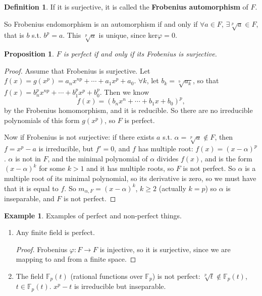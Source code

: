 \documentclass[9pt,reqno,twoside]{amsbook}
\theoremstyle{plain}
\numberwithin{section}{chapter}
\numberwithin{equation}{chapter}
\newtheorem{Prop}[theorem]{Proposition}
\theoremstyle{definition}
\newtheorem{Def}[theorem]{Definition}
\newtheorem{Ex}[theorem]{Example}
\theoremstyle{remark}
\theoremstyle{plain}
\newcommand{\F}{\mathbb{F}}
\renewcommand{\geq}{\geqslant}
\renewcommand{\phi}{\varphi}
\begin{document}
\begin{Def}
If it is surjective, it is called the \textbf{Frobenius automorphism} of $F$. 
\end{Def}

So Frobenius endomorphism is an automorphism if and only if $\forall a \in F$, $\exists \sqrt[p]{a} \in F$, that is $b$ s.t. $b^p = a$. This $\sqrt[p]{a}$ is unique, since ker$\phi = 0$. 

\begin{Prop}
$F$ is perfect if and only if its Frobenius is surjective. 
\end{Prop}

\begin{proof}
Assume that Frobenius is surjective. Let $f(x) = g(x^p) = a_nx^{np} + \cdots + a_1x^p + a_0$. $\forall k$, let $b_k = \sqrt[b]{a_k}$, so that $f(x) = b_n^px^{np} + \cdots + b_1^px^p + b_0^p$. Then we know
$$
f(x) = (b_nx^n + \cdots + b_1x + b_0)^p,
$$ by the Frobenius homomorphism, and it is reducible. So there are no irreducible polynomials of this form $g(x^p)$, so $F$ is perfect. 

Now if Frobenius is not surjective: if there exists $a$ s.t. $\alpha = \sqrt[p]{a} \notin F$, then $f = x^p - a$ is irreducible, but $f' = 0$, and $f$ has multiple root: $f(x) = (x - \alpha)^p$. $\alpha$ is not in $F$, and the minimal polynomial of $\alpha$ divides $f(x)$, and is the form $(x - \alpha)^k$ for some $k > 1$ and it has multiple roots, so $F$ is not perfect. So $\alpha$ is a multiple root of its minimal polynomial, so its derivative is zero, so we must have that it is equal to $f$. So $m_{\alpha,F} = (x - \alpha)^k$, $k \geq 2$ (actually $k = p$) so $\alpha$ is inseparable, and $F$ is not perfect. 
\end{proof}

\begin{Ex}
Examples of perfect and non-perfect things. 
\begin{enumerate}
\item Any finite field is perfect. 
\begin{proof}
Frobenius $\phi:F \to F$ is injective, so it is surjective, since we are mapping to and from a finite space. 
\end{proof}
\item The field $\F_p(t)$ (rational functions over $\F_p$) is not perfect: $\sqrt[p]{t} \notin \F_p(t)$, $t \in \F_p(t)$. $x^p - t$ is irreducible but inseparable. 
\end{enumerate}
\end{Ex}
\end{document}
